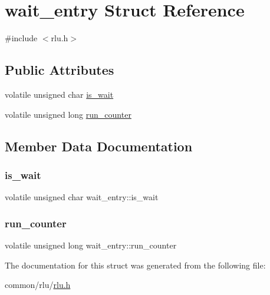 \hypertarget{structwait__entry}{}\section{wait\+\_\+entry Struct Reference}
\label{structwait__entry}


{\ttfamily \#include $<$rlu.\+h$>$}

\subsection*{Public Attributes}
\begin{DoxyCompactItemize}
\item 
volatile unsigned char \hyperlink{structwait__entry_aa174d34fb639b769492bbb246d778509}{is\+\_\+wait}
\item 
volatile unsigned long \hyperlink{structwait__entry_ac4be661e6120e248e2fe40599c243a87}{run\+\_\+counter}
\end{DoxyCompactItemize}


\subsection{Member Data Documentation}
\mbox{\label{structwait__entry_aa174d34fb639b769492bbb246d778509}} 
\subsubsection{\texorpdfstring{is\+\_\+wait}{is\_wait}}
{\footnotesize\ttfamily volatile unsigned char wait\+\_\+entry\+::is\+\_\+wait}

\mbox{\label{structwait__entry_ac4be661e6120e248e2fe40599c243a87}} 
\subsubsection{\texorpdfstring{run\+\_\+counter}{run\_counter}}
{\footnotesize\ttfamily volatile unsigned long wait\+\_\+entry\+::run\+\_\+counter}



The documentation for this struct was generated from the following file\+:\begin{DoxyCompactItemize}
\item 
common/rlu/\hyperlink{rlu_8h}{rlu.\+h}\end{DoxyCompactItemize}
